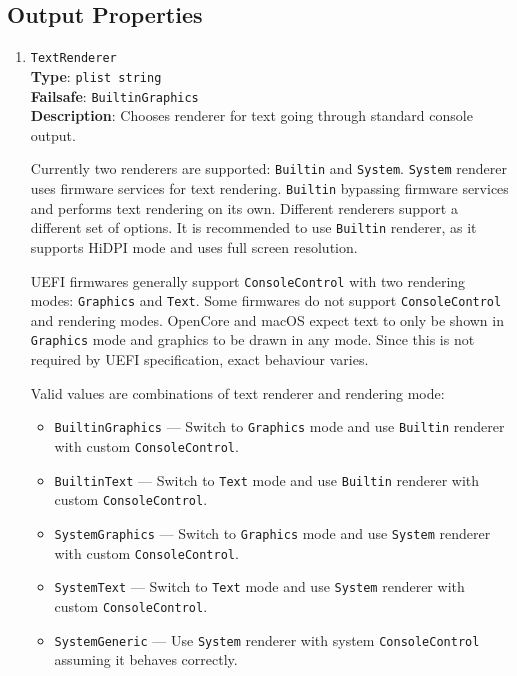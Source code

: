 \documentclass[]{article}
\makeatletter
\providecommand{\tightlist}{%
  \setlength{\itemsep}{0pt}\setlength{\parskip}{0pt}}
\renewcommand{\label}[1]{%
\zref@wrapper@immediate{\oldlabel{#1}}}  %
\makeatother
\begin{document}
\subsection{Output Properties}\label{uefioutputprops}

\begin{enumerate}

\item
  \texttt{TextRenderer}\\
  \textbf{Type}: \texttt{plist\ string}\\
  \textbf{Failsafe}: \texttt{BuiltinGraphics}\\
  \textbf{Description}: Chooses renderer for text going through standard
  console output.

  Currently two renderers are supported: \texttt{Builtin} and
  \texttt{System}. \texttt{System} renderer uses firmware services
  for text rendering. \texttt{Builtin} bypassing firmware services
  and performs text rendering on its own. Different renderers support
  a different set of options. It is recommended to use \texttt{Builtin}
  renderer, as it supports HiDPI mode and uses full screen resolution.

  UEFI firmwares generally support \texttt{ConsoleControl} with two
  rendering modes: \texttt{Graphics} and \texttt{Text}. Some firmwares
  do not support \texttt{ConsoleControl} and rendering modes. OpenCore
  and macOS expect text to only be shown in \texttt{Graphics} mode and
  graphics to be drawn in any mode. Since this is not required by UEFI
  specification, exact behaviour varies.

  Valid values are combinations of text renderer and rendering mode:

  \begin{itemize}
  \tightlist
  \item \texttt{BuiltinGraphics} --- Switch to \texttt{Graphics}
    mode and use \texttt{Builtin} renderer with
    custom \texttt{ConsoleControl}.
  \item \texttt{BuiltinText} --- Switch to \texttt{Text}
    mode and use \texttt{Builtin} renderer with
    custom \texttt{ConsoleControl}.
  \item \texttt{SystemGraphics} --- Switch to \texttt{Graphics}
    mode and use \texttt{System} renderer with
    custom \texttt{ConsoleControl}.
  \item \texttt{SystemText} --- Switch to \texttt{Text}
    mode and use \texttt{System} renderer with
    custom \texttt{ConsoleControl}.
  \item \texttt{SystemGeneric} --- Use \texttt{System} renderer with
    system \texttt{ConsoleControl} assuming it behaves correctly.
  \end{itemize}


\end{enumerate}
\end{document}
